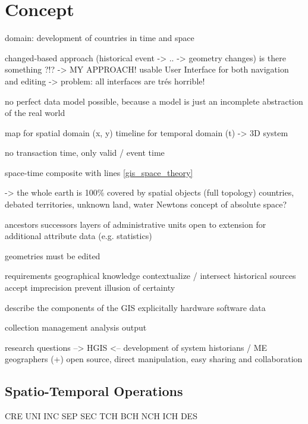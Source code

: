
\chapter{Concept} %
\label{sec:concept}

domain: development of countries in time and space

changed-based approach (historical event -> .. -> geometry changes)
  is there something ?!?
  -> MY APPROACH!
usable User Interface for both navigation and editing
-> problem: all interfaces are trés horrible!

no perfect data model possible, because a model is just an incomplete abstraction of the real world

map for spatial domain (x, y)
timeline for temporal domain (t)
-> 3D system

no transaction time, only valid / event time

space-time composite with lines
\ref{gis_space_theory}

-> the whole earth is 100\% covered by spatial objects (full topology)
  countries, debated territories, unknown land, water
  Newtons concept of absolute space?

ancestors successors
layers of administrative units
open to extension for additional attribute data (e.g. statistics)

geometries must be edited

requirements
  geographical knowledge
  contextualize / intersect historical sources
  accept imprecision
  prevent illusion of certainty

describe the components of the GIS explicitally
 hardware
 software
 data

 collection
 management
 analysis
 output


research questions --> HGIS <-- development of system
  historians /                           ME
  geographers
(+) open source, direct manipulation, easy sharing and collaboration




\section{Spatio-Temporal Operations} %
\label{sub:spatio_temporal_operations}

CRE
UNI
INC
SEP
SEC
TCH
BCH
NCH
ICH
DES



